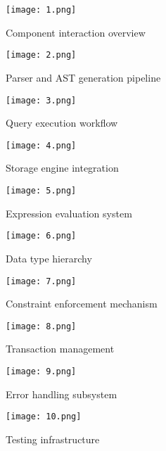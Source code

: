 \documentclass[12pt,a4paper]{article}
\begin{document}
\begin{figure}[h!]
\centering
\texttt{[image: 1.png]}
\caption{Component interaction overview}
\end{figure}

\begin{figure}[h!]
\centering
\texttt{[image: 2.png]}
\caption{Parser and AST generation pipeline}
\end{figure}

\clearpage %
\begin{figure}[h!]
\centering
\texttt{[image: 3.png]}
\caption{Query execution workflow}
\end{figure}

\begin{figure}[h!]
\centering
\texttt{[image: 4.png]}
\caption{Storage engine integration}
\end{figure}

\clearpage %
\begin{figure}[h!]
\centering
\texttt{[image: 5.png]}
\caption{Expression evaluation system}
\end{figure}

\begin{figure}[h!]
\centering
\texttt{[image: 6.png]}
\caption{Data type hierarchy}
\end{figure}

\clearpage %
\begin{figure}[h!]
\centering
\texttt{[image: 7.png]}
\caption{Constraint enforcement mechanism}
\end{figure}

\begin{figure}[h!]
\centering
\texttt{[image: 8.png]}
\caption{Transaction management}
\end{figure}

\clearpage %
\begin{figure}[h!]
\centering
\texttt{[image: 9.png]}
\caption{Error handling subsystem}
\end{figure}

\begin{figure}[h!]
\centering
\texttt{[image: 10.png]}
\caption{Testing infrastructure}
\end{figure}
\end{document}
